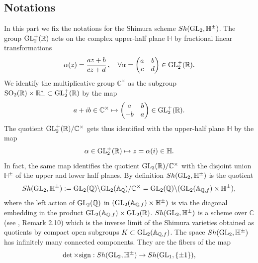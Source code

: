 \documentclass[graybox, envcountsect%
]{svmult}
\def\GL{{\rm GL}}
\def\A{{\mathbb A}}
\def\C{{\mathbb C}}
\def\Q{{\mathbb Q}}
\def\R{{\mathbb R}}
\def\H{{\mathbb H}}
\begin{document}
 \subsection{Notations}\label{subsec:6.1}

In this part we fix the notations for the Shimura scheme $Sh(\GL_2,\H^\pm)$.
The group $\GL_2^+ (\R)$ acts on the complex upper-half
plane $\H$ by fractional linear transformations 
\begin{equation}\label{actalpha1}
\alpha(z) = \frac{az+b}{cz+d} \,,\quad \forall \alpha=\begin{pmatrix} a &b \\
c &d \end{pmatrix} \in \GL_2^+ (\R).
\end{equation}
We identify the multiplicative group $\C^\times$ as the subgroup  ${\rm SO}_2(\R)\times \R_+^*\subset\GL_2^+ (\R)$ by the map 
\begin{equation}\label{inclGL2R}
 a+i b \in \C^\times \mapsto \begin{pmatrix} a &b \\ -b &a
\end{pmatrix} \in \GL_2^+ (\R).
\end{equation}
The quotient $\GL_2^+ (\R)/\C^\times$ gets thus identified with the upper-half
plane $\H$ by the map
\begin{equation}\label{upper}
\alpha\in \GL_2^+ (\R)\mapsto z=\alpha(i)\in \H.
\end{equation}
In fact, the same map identifies the quotient $\GL_2(\R)/\C^\times$ with the disjoint union $\H^\pm$ of the upper and lower half
planes. 
By definition $Sh(\GL_2,\H^\pm)$ is  the
quotient
\begin{equation}\label{ShGL2Hpm}
Sh(\GL_2,\H^\pm):=\GL_2(\Q)\backslash \GL_2(\A_{\Q})/\C^\times=\GL_2(\Q)\backslash (\GL_2(\A_{\Q,f})\times
\H^\pm),
\end{equation}
where the left action of $\GL_2(\Q)$ in $(\GL_2(\A_{\Q,f})\times
\H^\pm)$ is via the diagonal embedding in the product $\GL_2(\A_{\Q,f})\times \GL_2 (\R)$. $Sh(\GL_2,\H^\pm)$ is a scheme over $\C$ (see \cite{milne}, Remark 2.10) which is the inverse limit of the Shimura varieties obtained as quotients by compact open subgroups  $K\subset \GL_2(\A_{\Q,f})$.
The space $Sh(\GL_2,\H^\pm)$ has infinitely many connected components. They are the fibers of the map
\begin{equation}\label{pi0Sh}
\det \times {\rm sign}: Sh(\GL_2,\H^{\pm}) \to Sh(\GL_1,\{\pm 1\}),
\end{equation}
\end{document}
